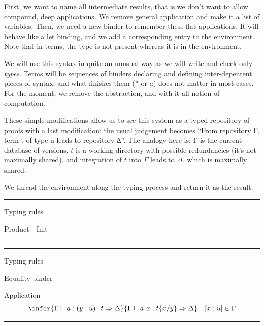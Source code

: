 \documentclass[ignorenonframetext,red]{beamer}
\begin{document}
First, we want to name all intermediate results, that is we don't want
to allow compound, deep applications. We remove general application
and make it a list of variables. Then, we need a new binder to
remember these flat applications. It will behave like a \textsf{let}
binding, and we add a corresponding entry to the environment. Note
that in terms, the type is not present whereas it is in the
environment.

We will use this syntax in quite an unusual way as we will write and
check only \emph{types}. Terms will be sequences of binders declaring
and defining inter-depentent pieces of syntax, and what finishes them
(* or $a$) does not matter in most cases. For the moment, we remove
the abstraction, and with it all notion of computation.

These simple modifications allow us to see this system as a typed
repository of proofs with a last modification: the usual judgement
becomes ``From repository Γ, term t of type u leads to repository
∆''. The analogy here is: Γ is the current database of versions, $t$
is a working directory with possible redundancies (it's not maximally
shared), and integration of $t$ into $\Gamma$ leads to $\Delta$, which
is maximally shared.

We thread the environment along the typing process and return it as
the result.

\hrule
\begin{frame}{Typing rules}
  \begin{block}{Product - Init}
  \end{block}
\end{frame}
\hrule

\hrule
\begin{frame}{Typing rules}
  \begin{block}{Equality binder}
  \end{block}
  \pause
  \begin{block}{Application}
    \[ \infer
      {\Gamma\vdash a : (y:u)\cdot t \Rightarrow\Delta}
      {\Gamma\vdash a\ x : t \{x/y\} \Rightarrow\Delta}
      \quad [x : u] \in \Gamma
      \]
  \end{block}
\end{frame}
\hrule
\end{document}
